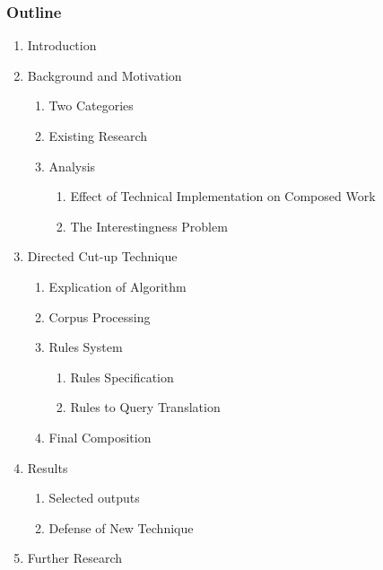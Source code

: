 \documentclass[10pt]{article}
\begin{document}
\subsubsection{Outline}
\onehalfspacing
\begin{enumerate}
\item Introduction
\item Background and Motivation
    \begin{enumerate}
    \item Two Categories
    \item Existing Research
    \item Analysis
        \begin{enumerate}
        \item Effect of Technical Implementation on Composed Work
        \item The Interestingness Problem
        \end{enumerate}
    \end{enumerate}
\item Directed Cut-up Technique
    \begin{enumerate}
    \item Explication of Algorithm
    \item Corpus Processing
    \item Rules System
        \begin{enumerate}
        \item Rules Specification
        \item Rules to Query Translation
        \end{enumerate}
    \item Final Composition
    \end{enumerate}
\item Results
    \begin{enumerate}
    \item Selected outputs
    \item Defense of New Technique
    \end{enumerate}
\item Further Research
\end{enumerate}

\doublespacing
\end{document}
